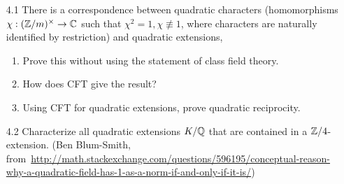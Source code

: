 \begin{enumerate}
\begin{enumerate}
\end{enumerate}
\item[4.1] There is a correspondence between quadratic characters (homomorphisms $\chi:(\mathbb{Z}/m)^{\times}\to \mathbb{C}$ such that $\chi^2=1, \chi\nequiv 1$, where characters are naturally identified by restriction) and quadratic extensions,
\begin{enumerate}
\item
Prove this without using the statement of class field theory.
\item
How does CFT give the result?
\item 
Using CFT for quadratic extensions, prove quadratic reciprocity.
\end{enumerate}
\item[4.2] 
Characterize all quadratic extensions $K/\mathbb{Q}$ that are contained in a $\mathbb{Z}/4$-extension. 
(Ben Blum-Smith, from~\url{http://math.stackexchange.com/questions/596195/conceptual-reason-why-a-quadratic-field-has-1-as-a-norm-if-and-only-if-it-is/})
\end{enumerate}